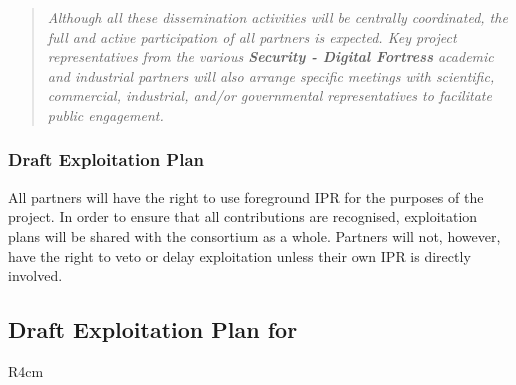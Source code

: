 \documentclass[a4paper,11pt]{article}
\newcommand{\project}[1]{\textbf{#1}\xspace}
\newcommand{\SECURITY}{\project{Security - Digital Fortress}}
\newcommand{\TheProject}{\SECURITY}
\begin{document}

\begin{quote}

\emph{Although all these dissemination activities
will be centrally coordinated, the full and active participation of
all partners is expected. Key project representatives from
the various \TheProject{} academic and industrial
partners will also arrange specific meetings
with scientific, commercial, industrial, and/or
governmental representatives to facilitate public
engagement.}
\end{quote}

\subsubsection{Draft Exploitation Plan}
\label{sect:exploitation-plan}
\vspace{-12pt}

All partners will have the right to use foreground IPR for
the purposes of the project. In order to ensure that all
contributions are recognised, exploitation plans will be
shared with the consortium as a whole. Partners will not,
however, have the right to veto or delay exploitation
unless their own IPR is directly involved.


\horizontalline

\subsection*{Draft Exploitation Plan for \IBMshort{}}


\begin{wrapfigure}{R}{4cm}
\vspace{-1.4cm}
\hfill {}
\vspace{-0.6cm}
\end{wrapfigure}
\end{document}
